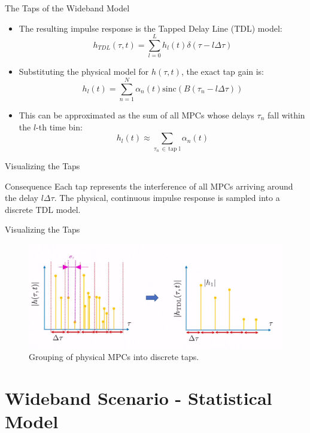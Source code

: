 \documentclass{beamer}
\begin{document}
	\begin{frame}{The Taps of the Wideband Model}
		\begin{itemize}
			\item The resulting impulse response is the Tapped Delay Line (TDL) model:
			\[ h_{TDL}(\tau, t) = \sum_{l=0}^{L} h_l(t) \delta(\tau - l\Delta\tau) \]
			
			\item Substituting the physical model for $h(\tau,t)$, the exact tap gain is:
			\[ h_l(t) = \sum_{n=1}^{N} \alpha_n(t) \text{sinc}(B(\tau_n - l\Delta\tau)) \]
			
			\item This can be approximated as the sum of all MPCs whose delays $\tau_n$ fall within the $l$-th time bin:
			\[ h_l(t) \approx \sum_{\tau_n \, \in \, \text{tap l}} \alpha_n(t) \]
		\end{itemize}
	\end{frame}
	
	\begin{frame}{Visualizing the Taps}
		\begin{block}{Consequence}
			Each tap represents the interference of all MPCs arriving around the delay $l\Delta\tau$. The physical, continuous impulse response is sampled into a discrete TDL model.
		\end{block}
	\end{frame}
	
	\begin{frame}{Visualizing the Taps}
		\begin{figure}
			\centering
			\includegraphics[width=0.9\linewidth]{pictures/tdl-grouping.png}
			\caption{Grouping of physical MPCs into discrete taps.}
		\end{figure}
	\end{frame}
	
	\section{Wideband Scenario - Statistical Model}
	
\end{document}
